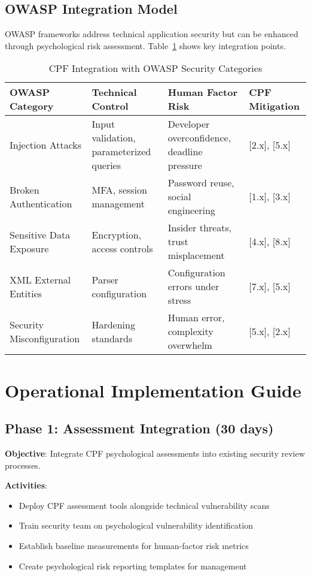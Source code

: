 \documentclass[11pt,a4paper]{article}
\begin{document}
\subsection{OWASP Integration Model}

OWASP frameworks address technical application security but can be enhanced through psychological risk assessment. Table~\ref{tab:owasp-mapping} shows key integration points.

\begin{table}[H]
\centering
\caption{CPF Integration with OWASP Security Categories}
\label{tab:owasp-mapping}
\begin{tabular}{p{4cm}p{4cm}p{4cm}p{3cm}}
\toprule
\textbf{OWASP Category} & \textbf{Technical Control} & \textbf{Human Factor Risk} & \textbf{CPF Mitigation} \\
\midrule
Injection Attacks & Input validation, parameterized queries & Developer overconfidence, deadline pressure & [2.x], [5.x] \\
Broken Authentication & MFA, session management & Password reuse, social engineering & [1.x], [3.x] \\
Sensitive Data Exposure & Encryption, access controls & Insider threats, trust misplacement & [4.x], [8.x] \\
XML External Entities & Parser configuration & Configuration errors under stress & [7.x], [5.x] \\
Security Misconfiguration & Hardening standards & Human error, complexity overwhelm & [5.x], [2.x] \\
\bottomrule
\end{tabular}
\end{table}

\section{Operational Implementation Guide}

\subsection{Phase 1: Assessment Integration (30 days)}

\textbf{Objective}: Integrate CPF psychological assessments into existing security review processes.

\textbf{Activities}:
\begin{itemize}
\item Deploy CPF assessment tools alongside technical vulnerability scans
\item Train security team on psychological vulnerability identification
\item Establish baseline measurements for human-factor risk metrics
\item Create psychological risk reporting templates for management
\end{itemize}
\end{document}
